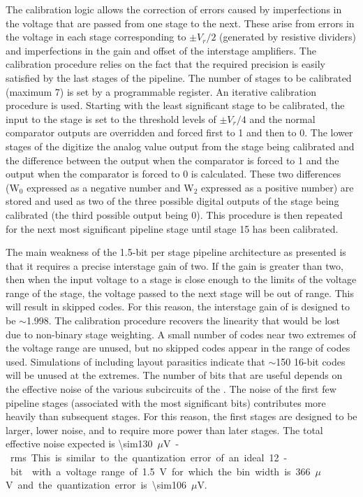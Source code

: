 The calibration logic allows the correction of errors caused by imperfections
in the voltage that are passed from one stage to the next.  These arise from
errors in the voltage in each stage corresponding to $\pm V_r/2$
(generated by resistive dividers) and imperfections in the gain and offset of
the interstage amplifiers.  The calibration procedure relies on the fact that
the required precision is easily satisfied by the last stages of the pipeline.
The number of stages to be calibrated (maximum \num{7}) is set by a programmable
register.  An iterative calibration procedure is used.  Starting with the least
significant stage to be calibrated, the input to the stage is set to the threshold
levels of $\pm V_r/4$ and the normal comparator outputs are overridden
and forced first to \num{1} and then to \num{0}.  The lower stages of the  digitize
the analog value output from the stage being calibrated and the difference between
the  output when the comparator is forced to \num{1} and the 
output when the comparator is forced to \num{0} is calculated.  These two differences
(W$_0$ expressed as a negative number and W$_2$ expressed as a positive number) are
stored and used as two of the three possible digital outputs of the stage being
calibrated (the third possible output being \num{0}).  This procedure is then repeated
for the next most significant pipeline stage until stage \num{15} has been calibrated.

The main weakness of the \num{1.5}-bit per stage pipeline architecture as presented
is that it requires a precise interstage gain of two.  If the gain is greater
than two, then when the input voltage to a stage is close enough to the limits
of the voltage range of the stage, the voltage passed to the next stage will be
out of range.  This will result in skipped  codes.  For this reason,
the interstage gain of  is designed to be $\sim$\num{1.998}.  The
calibration procedure recovers the linearity that would be lost due to
non-binary stage weighting.  A small number of  codes near two
extremes of the voltage range are unused, but no skipped codes appear in the
range of codes used. Simulations of  including layout parasitics 
indicate that $\sim$\num{150} \num{16}-bit codes will be unused at the extremes.
The number of  bits that are useful depends on the effective
noise of the various subcircuits of the .  The noise of the first few
pipeline stages (associated with the most significant bits) contributes more
heavily than subsequent stages.  For this reason, the first stages are designed
to be larger, lower noise, and to require more power than later stages.  The total
effective noise expected is \SI{\sim130}{$\mu$V}-rms.  This is similar to the
quantization error of an ideal \num{12}-bit  with a voltage range of
\SI{1.5}{V} for which the bin width is \SI{366}{$\mu$V} and the quantization
error is \SI{\sim106}{$\mu$V}.

